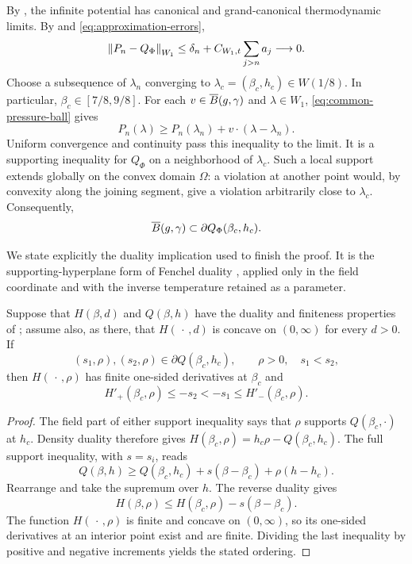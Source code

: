 By , the infinite potential has canonical and
grand-canonical thermodynamic limits.
By  and \eqref{eq:approximation-errors},
\[
 \left\lVert P_n-Q_\Phi\right\rVert_{W_1}
 \le \delta_n+
 C_{W_1,t}\sum_{j>n}a_j\longrightarrow0.
\]
Choose a subsequence of \(\lambda_n\) converging to
\(\lambda_c=(\beta_c,h_c)\in W(1/8)\).
In particular, \(\beta_c\in[7/8,9/8]\).
For each \(v\in\overline B(g,\gamma)\) and \(\lambda\in W_1\),
\eqref{eq:common-pressure-ball} gives
\[
 P_n(\lambda)\ge P_n(\lambda_n)+v\cdot(\lambda-\lambda_n).
\]
Uniform convergence and continuity pass this inequality to the limit.
It is a supporting inequality for \(Q_\Phi\) on a neighborhood of
\(\lambda_c\).
Such a local support extends globally on the convex domain \(\Omega\):
a violation at another point would, by convexity along the joining
segment, give a violation arbitrarily close to \(\lambda_c\).
Consequently,
\begin{equation}\label{eq:limiting-support-ball}
 \overline B(g,\gamma)\subset\partial Q_\Phi(\beta_c,h_c).
\end{equation}

We state explicitly the duality implication used to finish the proof.
It is the supporting-hyperplane form of Fenchel duality
\citep[Theorem~11.1 and Proposition~11.3]{RockafellarWets1998}, applied
only in the field coordinate and with the inverse temperature retained
as a parameter.

\begin{lemma}\label{m:canonical-corner}
Suppose that \(H(\beta,d)\) and \(Q(\beta,h)\) have the duality and
finiteness properties of ; assume also, as there,
that \(H(\,\cdot\,,d)\) is concave on \((0,\infty)\) for every \(d>0\).
If
\[
 (s_1,\rho),(s_2,\rho)\in\partial Q(\beta_c,h_c),
 \qquad \rho>0,\quad s_1<s_2,
\]
then \(H(\,\cdot\,,\rho)\) has finite one-sided derivatives at \(\beta_c\)
and
\[
 H'_+(\beta_c,\rho)\le-s_2<-s_1\le H'_-(\beta_c,\rho).
\]
\end{lemma}

\begin{proof}
The field part of either support inequality says that \(\rho\) supports
\(Q(\beta_c,\cdot)\) at \(h_c\).
Density duality therefore gives
\(H(\beta_c,\rho)=h_c\rho-Q(\beta_c,h_c)\).
The full support inequality, with \(s=s_i\), reads
\[
 Q(\beta,h)\ge Q(\beta_c,h_c)
                 +s(\beta-\beta_c)+\rho(h-h_c).
\]
Rearrange and take the supremum over \(h\).
The reverse duality gives
\[
 H(\beta,\rho)\le H(\beta_c,\rho)-s(\beta-\beta_c).
\]
The function \(H(\,\cdot\,,\rho)\) is finite and concave on
\((0,\infty)\), so its one-sided derivatives at an interior point
exist and are finite.
Dividing the last inequality by positive and negative increments yields
the stated ordering.
\end{proof}

